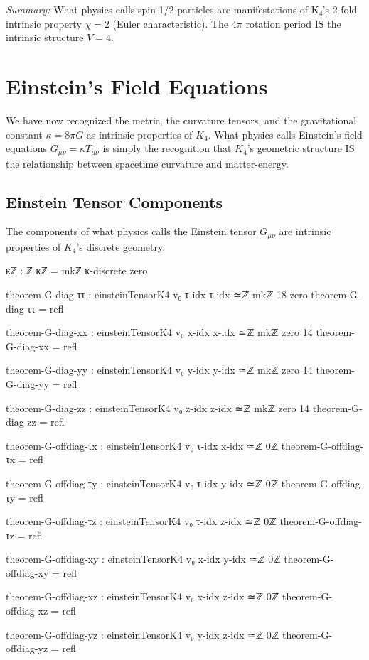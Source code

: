 \documentclass[11pt,a4paper]{book}
\begin{document}
\medskip
\noindent\textit{Summary:} What physics calls spin-1/2 particles are manifestations of K₄'s 2-fold intrinsic property 
$\chi = 2$ (Euler characteristic). The $4\pi$ rotation period IS the intrinsic structure $V = 4$.


\chapter{Einstein's Field Equations}
\label{chap:einstein-equations}

We have now recognized the metric, the curvature tensors, and the gravitational constant 
$\kappa = 8\pi G$ as intrinsic properties of $K_4$. What physics calls Einstein's 
field equations $G_{\mu\nu} = \kappa T_{\mu\nu}$ is simply the recognition that $K_4$'s 
geometric structure IS the relationship between spacetime curvature and matter-energy.

\section{Einstein Tensor Components}

The components of what physics calls the Einstein tensor $G_{\mu\nu}$ are intrinsic properties of $K_4$'s discrete geometry.

\begin{code}
κℤ : ℤ
κℤ = mkℤ κ-discrete zero

theorem-G-diag-ττ : einsteinTensorK4 v₀ τ-idx τ-idx ≃ℤ mkℤ 18 zero
theorem-G-diag-ττ = refl

theorem-G-diag-xx : einsteinTensorK4 v₀ x-idx x-idx ≃ℤ mkℤ zero 14
theorem-G-diag-xx = refl

theorem-G-diag-yy : einsteinTensorK4 v₀ y-idx y-idx ≃ℤ mkℤ zero 14
theorem-G-diag-yy = refl

theorem-G-diag-zz : einsteinTensorK4 v₀ z-idx z-idx ≃ℤ mkℤ zero 14
theorem-G-diag-zz = refl

theorem-G-offdiag-τx : einsteinTensorK4 v₀ τ-idx x-idx ≃ℤ 0ℤ
theorem-G-offdiag-τx = refl

theorem-G-offdiag-τy : einsteinTensorK4 v₀ τ-idx y-idx ≃ℤ 0ℤ
theorem-G-offdiag-τy = refl

theorem-G-offdiag-τz : einsteinTensorK4 v₀ τ-idx z-idx ≃ℤ 0ℤ
theorem-G-offdiag-τz = refl

theorem-G-offdiag-xy : einsteinTensorK4 v₀ x-idx y-idx ≃ℤ 0ℤ
theorem-G-offdiag-xy = refl

theorem-G-offdiag-xz : einsteinTensorK4 v₀ x-idx z-idx ≃ℤ 0ℤ
theorem-G-offdiag-xz = refl

theorem-G-offdiag-yz : einsteinTensorK4 v₀ y-idx z-idx ≃ℤ 0ℤ
theorem-G-offdiag-yz = refl
\end{code}
\end{document}
